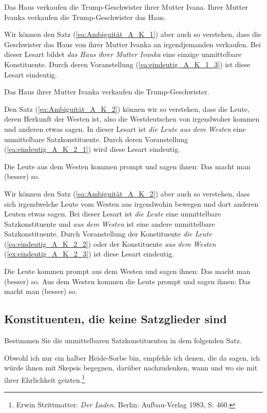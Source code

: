 \ea 
\ea \label{ea:eindeutig_A_K_1_1} Das Haus verkaufen die Trump-Geschwister ihrer Mutter Ivana.
\ex \label{ex:eindeutig_A_K_1_2} Ihrer Mutter Ivanka verkaufen die Trump-Geschwister das Haus.
\z 
\z 

Wir können den Satz (\ref{ea:Ambiguität_A_K_1}) aber auch so verstehen, dass die Geschwister das Haus von ihrer Mutter Ivanka an irgendjemanden verkaufen. Bei dieser Lesart bildet \textit{das Haus ihrer Mutter Ivanka} eine einzige unmittelbare Konstituente. Durch deren Voranstellung (\ref{ea:eindeutig_A_K_1_3}) ist diese Lesart eindeutig.  

\ea \label{ea:eindeutig_A_K_1_3} Das Haus ihrer Mutter Ivanka verkaufen die Trump-Geschwister.
\z 

Den Satz (\ref{ea:Ambiguität_A_K_2}) können wir so verstehen, dass die Leute, deren Herkunft der Westen ist, also die Westdeutschen von irgendwoher kommen und anderen etwas sagen. In dieser Lesart ist \textit{die Leute aus dem Westen} eine unmittelbare Satzkonstituente. Durch deren Voranstellung (\ref{ea:eindeutig_A_K_2_1}) wird diese Lesart eindeutig. 

\ea \label{ea:eindeutig_A_K_2_1} Die Leute aus dem Westen kommen prompt und sagen ihnen: Das macht man (besser) so.
\z 

Wir können den Satz (\ref{ea:Ambiguität_A_K_2}) aber auch so verstehen, dass sich irgendwelche Leute vom Westen aus irgendwohin bewegen und dort anderen Leuten etwas sagen. Bei dieser Lesart ist \textit{die Leute} eine unmittelbare Satzkonstituente und \textit{aus dem Westen} ist eine andere unmittelbare Satzkonstituente. Durch Voranstellung der Konstituente \textit{die Leute} (\ref{ea:eindeutig_A_K_2_2}) oder der Konstituente \textit{aus dem Westen} (\ref{ex:eindeutig_A_K_2_3}) ist diese Lesart eindeutig.

\ea 
\ea \label{ea:eindeutig_A_K_2_2} Die Leute kommen prompt aus dem Westen und sagen ihnen: Das macht man (besser) so.
\ex \label{ex:eindeutig_A_K_2_3} Aus dem Westen kommen die Leute prompt und sagen ihnen: Das macht man (besser) so.
\z 
\z 


\subsection{Konstituenten, die keine Satzglieder sind}\label{subsection:A_Konstituenz4}

Bestimmen Sie die unmittelbaren Satzkonstituenten in dem folgenden Satz. 

\ea \label{ea:Aufgabe1_Konstituenz} Obwohl ich nur ein halber Heide-Sorbe bin, empfehle ich denen, die da sagen, ich würde ihnen mit Skepsis begegnen, darüber nachzudenken, wann und wo sie mit ihrer Ehrlichkeit geizten.\footnote{Erwin Strittmatter: \textit{Der Laden}. Berlin: Aufbau-Verlag 1983, S. 460.}
\z 


